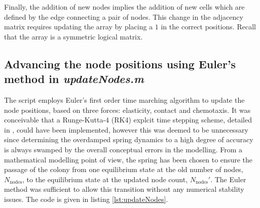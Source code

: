 Finally, the addition of new nodes implies the addition of new cells which 
are defined by the edge connecting a pair of nodes. This 
change in the adjacency matrix requires updating the 
array by placing a $1$ in the correct positions. Recall that 
the  array is a symmetric logical matrix.

\subsection{Advancing the node positions using Euler's method in \textit{updateNodes.m}} \label{ssec:updatenodes}
The  script employs Euler's first order
time marching algorithm to update the node positions, 
based on three forces: elasticity, contact and chemotaxis. 
It was conceivable that a Runge-Kutta-$4$ (RK4) explcit time stepping scheme,
 detailed in \cite{zingg1999runge},
could have been implemented, however this was deemed to be unnecessary since
determining the overdamped spring dynamics to a high degree of accuracy 
is always swamped by the overall conceptual errors in the modelling. 
From a mathematical modelling point of view, the spring has been 
chosen to ensure the passage of the colony from one equilibrium state 
at the old number of nodes, $N_{\textrm{nodes}}$, to the equilibrium state 
at the updated node count, $N_{\textrm{nodes}}'$. The Euler method 
was sufficient to allow this transition without 
any numerical stability issues. The code is given  in listing \ref{lst:updateNodes}.

